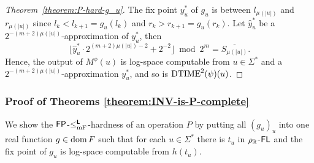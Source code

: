 \documentclass[envcountsect,envcountsame,orivec,oribibl]{llncs}
\begin{document}
\begin{proof}[Theorem~\ref{theorem:P-hard-g_u}]
 The fix point $y^*_u$ of $g_u$ is between $l_{\mu(|u|)}$ and $r_{\mu(|u|)}$ 
 since $l_k < l_{k+1} = g_u(l_k)$ and $r_k > r_{k+1} = g_u(r_k)$.
 Let $\hat y^*_u$ be a $2^{-(m+2)\mu(|u|)}$-approximation of $y^*_u$, then
\begin{equation}
 \lfloor \hat y^*_u \cdot 2^{(m+2)\mu(|u|)-2} + 2^{-2}\rfloor  \bmod 2^m
  =
  \overline{S_{\mu(|u|)}}.
\end{equation}
 Hence, the output of $M^\phi(u)$ is log-space computable from 
 $u \in \Sigma^*$ and a $2^{-(m+2)\mu(|u|)}$-approximation $y^*_u$, and so is
 $\mathrm{DTIME}^2(\psi)(u)$.
\end{proof}


\subsubsection{Proof of Theorems \ref{theorem:INV-is-P-complete}}
\label{section:proofs-of-theorems}

We show the $\mathsf{FP}$-$\leq _{\mathrm{mF}} ^{\text{\bfseries \sffamily \upshape L}}$-hardness of an operation $P$
by putting all $(g_u)_u$ into one real function $g \in \mathop{\rm dom} F$
such that for each $u \in \Sigma^*$ there is 
$t_u$ in $\rho _\mathbb R$-$\mathsf{FL}$ 
and the fix point of $g_u$ is log-space computable from $h(t_u)$.
\end{document}
